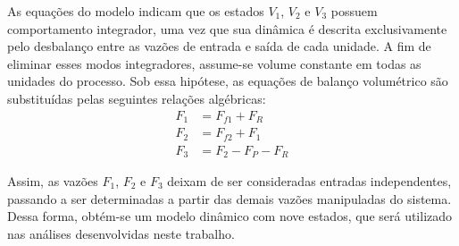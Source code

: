 As equações do modelo indicam que os estados $V_1$, $V_2$ e $V_3$ possuem comportamento integrador, uma vez que sua dinâmica é descrita exclusivamente pelo desbalanço entre as vazões de entrada e saída de cada unidade.
A fim de eliminar esses modos integradores, assume-se volume constante em todas as unidades do processo.
Sob essa hipótese, as equações de balanço volumétrico são substituídas pelas seguintes relações algébricas:
\begin{align}
  F_1 &= F_{f1} + F_R \\
  F_2 &= F_{f2} + F_1 \\
  F_3 &= F_2 - F_P - F_R
\end{align}

Assim, as vazões $F_1$, $F_2$ e $F_3$ deixam de ser consideradas entradas independentes, passando a ser determinadas a partir das demais vazões manipuladas do sistema. Dessa forma, obtém-se um modelo dinâmico com nove estados, que será utilizado nas análises desenvolvidas neste trabalho.
